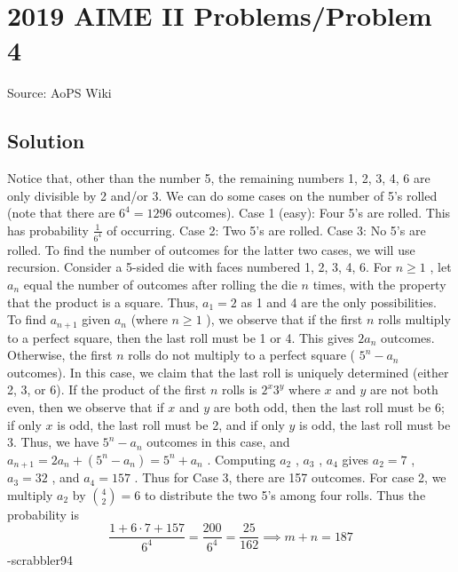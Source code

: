 \documentclass[12pt]{article}
\begin{document}
\section*{{2019 AIME II Problems/Problem 4}}
Source: AoPS Wiki

\subsection*{Solution}
Notice that, other than the number 5, the remaining numbers 1, 2, 3, 4, 6 are only divisible by 2 and/or 3. We can do some cases on the number of 5's rolled (note that there are $6^4 = 1296$ outcomes). Case 1 (easy): Four 5's are rolled. This has probability $\frac{1}{6^4}$ of occurring. Case 2: Two 5's are rolled. Case 3: No 5's are rolled. To find the number of outcomes for the latter two cases, we will use recursion. Consider a 5-sided die with faces numbered 1, 2, 3, 4, 6. For $n \ge 1$ , let $a_n$ equal the number of outcomes after rolling the die $n$ times, with the property that the product is a square. Thus, $a_1 = 2$ as 1 and 4 are the only possibilities. To find $a_{n+1}$ given $a_n$ (where $n \ge 1$ ), we observe that if the first $n$ rolls multiply to a perfect square, then the last roll must be 1 or 4. This gives $2a_n$ outcomes. Otherwise, the first $n$ rolls do not multiply to a perfect square ( $5^n - a_n$ outcomes). In this case, we claim that the last roll is uniquely determined (either 2, 3, or 6). If the product of the first $n$ rolls is $2^x 3^y$ where $x$ and $y$ are not both even, then we observe that if $x$ and $y$ are both odd, then the last roll must be 6; if only $x$ is odd, the last roll must be 2, and if only $y$ is odd, the last roll must be 3. Thus, we have $5^n - a_n$ outcomes in this case, and $a_{n+1} = 2a_n + (5^n - a_n) = 5^n + a_n$ . Computing $a_2$ , $a_3$ , $a_4$ gives $a_2 = 7$ , $a_3 = 32$ , and $a_4 = 157$ . Thus for Case 3, there are 157 outcomes. For case 2, we multiply $a_2$ by $\binom{4}{2} = 6$ to distribute the two 5's among four rolls. Thus the probability is \[\frac{1 + 6 \cdot 7 + 157}{6^4} = \frac{200}{6^4} = \frac{25}{162} \implies m+n = \boxed{187}\] -scrabbler94
\end{document}
